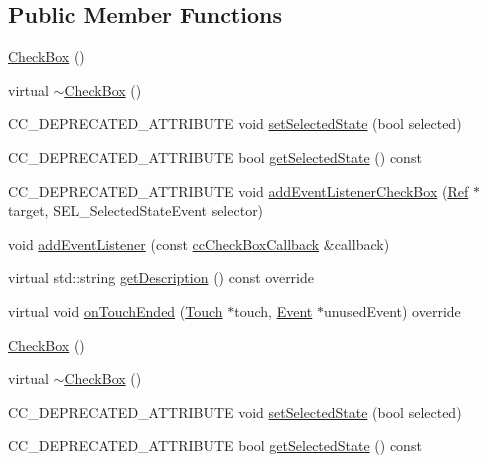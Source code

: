 \subsection*{Public Member Functions}
\begin{DoxyCompactItemize}
\item 
\hyperlink{classui_1_1CheckBox_ac425e54f8b23e74fe64c904f700c707b}{Check\+Box} ()
\item 
virtual \hyperlink{classui_1_1CheckBox_ab619b72d6e4ef57dd25c30f5c0afea62}{$\sim$\+Check\+Box} ()
\item 
C\+C\+\_\+\+D\+E\+P\+R\+E\+C\+A\+T\+E\+D\+\_\+\+A\+T\+T\+R\+I\+B\+U\+TE void \hyperlink{classui_1_1CheckBox_a44e1b53dcbc7ac25e41b72e2e4487775}{set\+Selected\+State} (bool selected)
\item 
C\+C\+\_\+\+D\+E\+P\+R\+E\+C\+A\+T\+E\+D\+\_\+\+A\+T\+T\+R\+I\+B\+U\+TE bool \hyperlink{classui_1_1CheckBox_ab406d6690121119d07b014c634bf894c}{get\+Selected\+State} () const
\item 
C\+C\+\_\+\+D\+E\+P\+R\+E\+C\+A\+T\+E\+D\+\_\+\+A\+T\+T\+R\+I\+B\+U\+TE void \hyperlink{classui_1_1CheckBox_aaaa8d3ac0fe69b257c7087e58b504364}{add\+Event\+Listener\+Check\+Box} (\hyperlink{classRef}{Ref} $\ast$target, S\+E\+L\+\_\+\+Selected\+State\+Event selector)
\item 
void \hyperlink{classui_1_1CheckBox_a11c1b9cd5d7314a980f994977f960822}{add\+Event\+Listener} (const \hyperlink{classui_1_1CheckBox_ad210762967d1b444f5cf94f5e7450c56}{cc\+Check\+Box\+Callback} \&callback)
\item 
virtual std\+::string \hyperlink{classui_1_1CheckBox_ac2793859e832554dca4c965bfd8d54ba}{get\+Description} () const override
\item 
virtual void \hyperlink{classui_1_1CheckBox_a95506c0d1b1bcab1b258ed62d4cc718a}{on\+Touch\+Ended} (\hyperlink{classTouch}{Touch} $\ast$touch, \hyperlink{classEvent}{Event} $\ast$unused\+Event) override
\item 
\hyperlink{classui_1_1CheckBox_ac425e54f8b23e74fe64c904f700c707b}{Check\+Box} ()
\item 
virtual \hyperlink{classui_1_1CheckBox_a84b3bb83cebc3f050bb3d6a1076757b4}{$\sim$\+Check\+Box} ()
\item 
C\+C\+\_\+\+D\+E\+P\+R\+E\+C\+A\+T\+E\+D\+\_\+\+A\+T\+T\+R\+I\+B\+U\+TE void \hyperlink{classui_1_1CheckBox_a44e1b53dcbc7ac25e41b72e2e4487775}{set\+Selected\+State} (bool selected)
\item 
C\+C\+\_\+\+D\+E\+P\+R\+E\+C\+A\+T\+E\+D\+\_\+\+A\+T\+T\+R\+I\+B\+U\+TE bool \hyperlink{classui_1_1CheckBox_ab406d6690121119d07b014c634bf894c}{get\+Selected\+State} () const

\end{DoxyCompactItemize}
